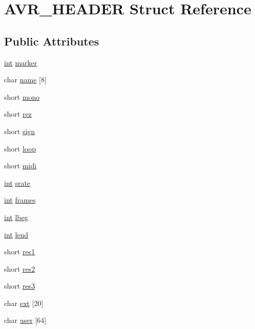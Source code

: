 \hypertarget{struct_a_v_r___h_e_a_d_e_r}{}\section{A\+V\+R\+\_\+\+H\+E\+A\+D\+ER Struct Reference}
\label{struct_a_v_r___h_e_a_d_e_r}
\subsection*{Public Attributes}
\begin{DoxyCompactItemize}
\item 
\hyperlink{xmltok_8h_a5a0d4a5641ce434f1d23533f2b2e6653}{int} \hyperlink{struct_a_v_r___h_e_a_d_e_r_a7c38a7a8d7c033c8eb0face93a166ca1}{marker}
\item 
char \hyperlink{struct_a_v_r___h_e_a_d_e_r_a16fef12e69100aa181317a6c387aa7ff}{name} \mbox{[}8\mbox{]}
\item 
short \hyperlink{struct_a_v_r___h_e_a_d_e_r_a961b3ca41e2f54642cd8039fe73a69de}{mono}
\item 
short \hyperlink{struct_a_v_r___h_e_a_d_e_r_a48cd5e735a4a96360eacfa0fe9d2c82f}{rez}
\item 
short \hyperlink{struct_a_v_r___h_e_a_d_e_r_aae30b47df8e938f0817ef017e7da211e}{sign}
\item 
short \hyperlink{struct_a_v_r___h_e_a_d_e_r_a497e7660901543420363306fa2c0ceea}{loop}
\item 
short \hyperlink{struct_a_v_r___h_e_a_d_e_r_a590dd9643ace5f41a5ea79f9a05ac65e}{midi}
\item 
\hyperlink{xmltok_8h_a5a0d4a5641ce434f1d23533f2b2e6653}{int} \hyperlink{struct_a_v_r___h_e_a_d_e_r_a8df917f423ed8e474cdca8fbf117cec0}{srate}
\item 
\hyperlink{xmltok_8h_a5a0d4a5641ce434f1d23533f2b2e6653}{int} \hyperlink{struct_a_v_r___h_e_a_d_e_r_ad57b97682159d0979f9e8c2151e8201a}{frames}
\item 
\hyperlink{xmltok_8h_a5a0d4a5641ce434f1d23533f2b2e6653}{int} \hyperlink{struct_a_v_r___h_e_a_d_e_r_af538723d1f6f2b0a22e1de0ea2b836ea}{lbeg}
\item 
\hyperlink{xmltok_8h_a5a0d4a5641ce434f1d23533f2b2e6653}{int} \hyperlink{struct_a_v_r___h_e_a_d_e_r_ae308c96e523e600f338b9d67cb751760}{lend}
\item 
short \hyperlink{struct_a_v_r___h_e_a_d_e_r_ab9dfa7b0721cd747f745c7bb32c00ae5}{res1}
\item 
short \hyperlink{struct_a_v_r___h_e_a_d_e_r_a7353a6f33643f3ffd1311af383e18fc0}{res2}
\item 
short \hyperlink{struct_a_v_r___h_e_a_d_e_r_a7943744922d5676c1734bd8489b9a5ee}{res3}
\item 
char \hyperlink{struct_a_v_r___h_e_a_d_e_r_a76221e88134aa1ab4a97b99acd9ff03b}{ext} \mbox{[}20\mbox{]}
\item 
char \hyperlink{struct_a_v_r___h_e_a_d_e_r_afb410cee307d39e940dabb00b945e3a8}{user} \mbox{[}64\mbox{]}
\end{DoxyCompactItemize}


